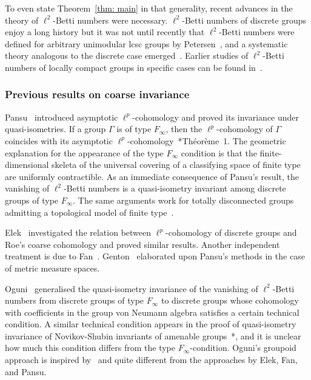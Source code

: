 \documentclass[10pt]{amsart}
\theoremstyle{plain}
\theoremstyle{definition}
\theoremstyle{remark}
\begin{document}
To even state Theorem~\ref{thm: main} in that generality, recent advances in the theory of $\ell^2$-Betti numbers were necessary. $\ell^2$-Betti numbers of 
discrete groups enjoy a long history but it was not until recently that $\ell^2$-Betti numbers were defined for arbitrary unimodular lcsc groups by Petersen~\cite{petersen}, and a systematic theory analogous to the discrete case emerged~. 
Earlier studies of $\ell^2$-Betti numbers
of locally compact groups in specific cases can be found
in~\cites{gaboriau-unimodular, dymara, davisetal}. 

\subsubsection*{Previous results on coarse invariance}
Pansu~\cite{pansu} introduced asymptotic $\ell^p$-co\-homo\-logy and proved
its invariance under quasi-isometries. If a group $\Gamma$ is of type $F_\infty$, then the $\ell^p$-cohomology of $\Gamma$ coincides with its asymptotic $\ell^p$-cohomology~\cite{pansu}*{Th\'{e}or\`{e}me~1}. The geometric explanation for the appearance of the type $F_\infty$ condition is that the finite-dimensional skeleta of the universal covering of a classifying space of finite type are uniformly contractible. As an immediate consequence of Pansu's result, the vanishing of $\ell^2$-Betti numbers is a quasi-isometry invariant among discrete groups of type $F_\infty$. The same arguments work for 
 totally disconnected groups admitting a topological model of finite type~\cite{sauer-survey}.

Elek~\cite{elek} investigated the relation between $\ell^p$-cohomology of discrete groups
and Roe's coarse cohomology and proved
similar results. Another independent treatment is due to Fan~\cite{fan}. Genton~\cite{genton} elaborated upon Pansu's methods in the case of metric measure spaces. 

Oguni~\cite{oguni} generalised the quasi-isometry invariance of the vanishing of $\ell^2$-Betti numbers from discrete groups of type $F_\infty$ to discrete groups whose cohomology with coefficients in the group von Neumann algebra satisfies a certain technical condition. A similar technical condition appears in the
proof of quasi-isometry invariance of Novikov-Shubin invariants of amenable groups~\cite{sauer-homology}*{}, and it is unclear how much this condition differs from the type $F_\infty$-condition.
Oguni's groupoid approach is inspired by~\cites{gaboriau, sauer-homology} and quite different from the approaches by Elek, Fan, and Pansu. 
\end{document}
